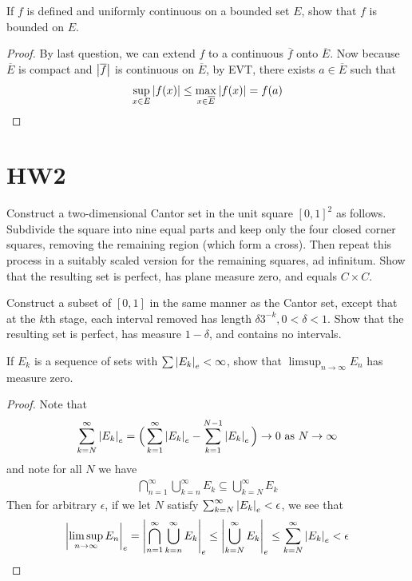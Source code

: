 \documentclass{report}
\begin{document}
\begin{question}{}{}
If $f$ is defined and uniformly continuous on a bounded set $E$, show that $f$ is bounded on $E$.
\end{question}
\begin{proof}
By last question, we can extend $f$ to a continuous $\overline{f}$ onto $\overline{E}$. Now because $\overline{E}$ is compact and $\left|\overline{f}\right|$ is continuous on $\overline{E}$, by EVT, there exists  $a\in \overline{E}$ such that 
\begin{align*}
\sup_{x\in E}\left|f(x)\right|\leq \max_{x\in \overline{E}}\left|f(x)\right|=f(a)
\end{align*}
\end{proof}
\section{HW2}
\begin{question}{}{}
Construct a two-dimensional Cantor set in the unit square $[0,1]^2$ as follows. Subdivide the square into nine equal parts and keep only the four closed corner squares, removing the remaining region (which form a cross). Then repeat this process in a suitably scaled version for the remaining squares, ad infinitum. Show that the resulting set is perfect, has plane measure zero, and equals $C\times C$. 
\end{question}
\begin{question}{}{}
Construct a subset of $[0,1]$ in the same manner as the Cantor set, except that at the $k$th stage, each interval removed has length  $\delta 3^{-k},0<\delta <1$. Show that the resulting set is perfect, has measure $1-\delta$, and contains no intervals.
\end{question}
\begin{question}{}{}
If $E_k$ is a sequence of sets with  $\sum \left|E_k\right|_e < \infty$, show that $\limsup_{n\to\infty} E_n$ has measure zero.
\end{question}
\begin{proof}
Note that  
\begin{align*}
\sum_{k=N}^{\infty} \left|E_k\right|_e = \Big(\sum_{k=1}^{\infty} \left|E_k\right|_e - \sum_{k=1}^{N-1} \left|E_k\right|_e \Big) \to 0\text{ as }N \to \infty
\end{align*}
and note for all $N$ we have 
\begin{align*}
\bigcap_{n=1}^{\infty} \bigcup_{k=n}^{\infty} E_k \subseteq \bigcup_{k=N}^{\infty} E_k
\end{align*}
Then for arbitrary $\epsilon $, if we let $N$ satisfy $\sum_{k=N}^{\infty} \left|E_k\right|_e < \epsilon $, we see that 
\begin{align*}
\left|\limsup_{n\to\infty} E_n\right|_e= \left|\bigcap_{n=1}^{\infty}\bigcup_{k=n}^{\infty}E_k\right|_e\leq \left|\bigcup_{k=N}^{\infty}E_k\right|_e\leq \sum_{k=N}^{\infty} \left|E_k\right|_e < \epsilon 
\end{align*}

\end{proof}
\end{document}
